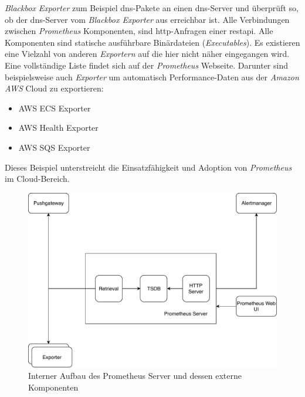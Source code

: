 \documentclass[titlepage]{report}
\begin{document}
\emph{Blackbox Exporter} zum Beispiel \gls{dns}\hyp{}Pakete an einen
\gls{dns}\hyp{}Server und überprüft so, ob der \gls{dns}\hyp{}Server vom
\emph{Blackbox Exporter} aus erreichbar ist.  Alle Verbindungen zwischen
\emph{Prometheus} Komponenten, sind \gls{http}\hyp{}Anfragen einer
\gls{restapi}. Alle Komponenten sind statische ausführbare Binärdateien
(\emph{Executables}). Es existieren eine Vielzahl von anderen
\emph{Exportern} auf die hier nicht näher eingegangen wird. Eine
vollständige Liste findet sich auf der \emph{Prometheus} Webseite.
Darunter sind beispielsweise auch \emph{Exporter} um automatisch
Performance\hyp{}Daten aus der \emph{Amazon AWS} Cloud zu
exportieren\cite{PROMETHEUS_EXPORTERS}:
\begin{itemize}
    \item AWS ECS Exporter\cite{ECS_EXPORTER}
    \item AWS Health Exporter\cite{AWS_HEALTH}
    \item AWS SQS Exporter\cite{SQS_EXPORTER}
\end{itemize}
Dieses Beispiel unterstreicht die Einsatzfähigkeit und Adoption von
\emph{Prometheus} im Cloud\hyp{}Bereich.
\begin{figure}[H]
    \centering
    \includegraphics[width=1.0\textwidth]{figures/prometheus.pdf}
    \caption{Interner Aufbau des Prometheus Server und dessen
    externe Komponenten}\label{fig:prometheus}
\end{figure}
\end{document}
